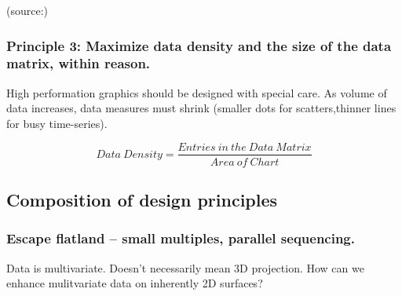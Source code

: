 \documentclass[]{book}
\theoremstyle{definition}
\theoremstyle{definition}
\theoremstyle{definition}
\theoremstyle{remark}
\begin{document}
(source:\citep{Tufte_2001})

\subsubsection{Principle 3: Maximize data density and the size of the
data matrix, within
reason.}\label{principle-3-maximize-data-density-and-the-size-of-the-data-matrix-within-reason.}

High performation graphics should be designed with special care. As
volume of data increases, data measures must shrink (smaller dots for
scatters,thinner lines for busy time-series).

\[{Data \ Density} = \frac{{Entries \ in \ the \ Data \ Matrix}}{{Area \ of \ Chart}}\]

\subsection{Composition of design
principles}\label{composition-of-design-principles}

\subsubsection{Escape flatland -- small multiples, parallel
sequencing.}\label{escape-flatland-small-multiples-parallel-sequencing.}

Data is multivariate. Doesn't necessarily mean 3D projection. How can we
enhance mulitvariate data on inherently 2D surfaces?
\end{document}
